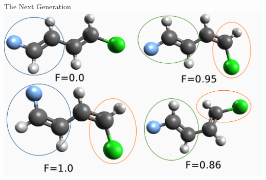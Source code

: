 \documentclass[10pt]{beamer}
\begin{document}
{{{%
\begin{frame}{The Next Generation}
    \includegraphics[width=\linewidth]{images/nextgen.png}
\end{frame}
}


}}
\end{document}
